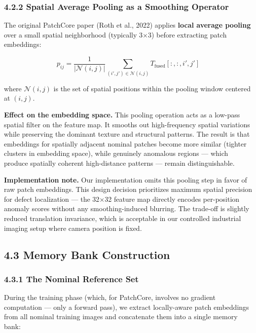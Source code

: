 \documentclass[12pt, a4paper, oneside]{report}
\begin{document}
\subsubsection{4.2.2 Spatial Average Pooling as a Smoothing Operator}\label{spatial-average-pooling-as-a-smoothing-operator}

The original PatchCore paper (Roth et al., 2022) applies \textbf{local average pooling} over a small spatial neighborhood (typically 3$\times$3) before extracting patch embeddings:

\[p_{ij} = \frac{1}{|\mathcal{N}(i,j)|} \sum_{(i', j') \in \mathcal{N}(i,j)} T_{\text{fused}}[:, :, i', j']\]

where \(\mathcal{N}(i,j)\) is the set of spatial positions within the pooling window centered at \((i,j)\).

\textbf{Effect on the embedding space.} This pooling operation acts as a low-pass spatial filter on the feature map. It smooths out high-frequency spatial variations while preserving the dominant texture and structural patterns. The result is that embeddings for spatially adjacent nominal patches become more similar (tighter clusters in embedding space), while genuinely anomalous regions --- which produce spatially coherent high-distance patterns --- remain distinguishable.

\textbf{Implementation note.} Our implementation omits this pooling step in favor of raw patch embeddings. This design decision prioritizes maximum spatial precision for defect localization --- the 32$\times$32 feature map directly encodes per-position anomaly scores without any smoothing-induced blurring. The trade-off is slightly reduced translation invariance, which is acceptable in our controlled industrial imaging setup where camera position is fixed.

\bigskip\noindent\hrulefill\bigskip

\subsection{4.3 Memory Bank Construction}\label{memory-bank-construction}

\subsubsection{4.3.1 The Nominal Reference Set}\label{the-nominal-reference-set}

During the training phase (which, for PatchCore, involves no gradient computation --- only a forward pass), we extract locally-aware patch embeddings from all nominal training images and concatenate them into a single memory bank:
\end{document}
